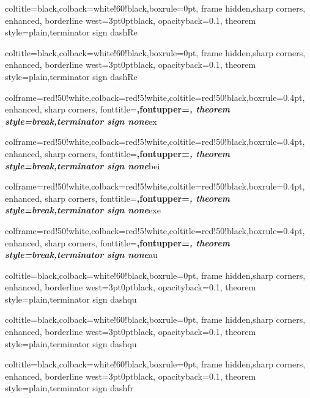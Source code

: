 %
{coltitle=black,colback=white!60!black,boxrule=0pt,
frame hidden,sharp corners, enhanced,
borderline west={3pt}{0pt}{black},
opacityback=0.1,
theorem style=plain,terminator sign dash}{Re}

%
{coltitle=black,colback=white!60!black,boxrule=0pt,
frame hidden,sharp corners, enhanced,
borderline west={3pt}{0pt}{black},
opacityback=0.1,
theorem style=plain,terminator sign dash}{Re}

%
{colframe=red!50!white,colback=red!5!white,coltitle=red!50!black,boxrule=0.4pt,
enhanced, sharp corners,
fonttitle=\upshape\bfseries,fontupper=\itshape,
theorem style=break,terminator sign none}{ex}

%
{colframe=red!50!white,colback=red!5!white,coltitle=red!50!black,boxrule=0.4pt,
enhanced, sharp corners,
fonttitle=\upshape\bfseries,fontupper=\itshape,
theorem style=break,terminator sign none}{bei}

%
{colframe=red!50!white,colback=red!5!white,coltitle=red!50!black,boxrule=0.4pt,
enhanced, sharp corners,
fonttitle=\upshape\bfseries,fontupper=\itshape,
theorem style=break,terminator sign none}{exe}

%
{colframe=red!50!white,colback=red!5!white,coltitle=red!50!black,boxrule=0.4pt,
enhanced, sharp corners,
fonttitle=\upshape\bfseries,fontupper=\itshape,
theorem style=break,terminator sign none}{au}

%
{coltitle=black,colback=white!60!black,boxrule=0pt,
frame hidden,sharp corners, enhanced,
borderline west={3pt}{0pt}{black},
opacityback=0.1,
theorem style=plain,terminator sign dash}{qu}

%
{coltitle=black,colback=white!60!black,boxrule=0pt,
frame hidden,sharp corners, enhanced,
borderline west={3pt}{0pt}{black},
opacityback=0.1,
theorem style=plain,terminator sign dash}{qu}

%
{coltitle=black,colback=white!60!black,boxrule=0pt,
frame hidden,sharp corners, enhanced,
borderline west={3pt}{0pt}{black},
opacityback=0.1,
theorem style=plain,terminator sign dash}{fr}

